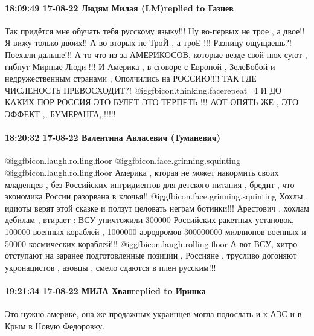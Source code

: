  
 
 
 
 

\paragraph{18:09:49 17-08-22 Людям Милая (LM)replied to Газиев}

\obeycr
Так придётся мне обучать тебя русскому языку!!!
Ну во-первых не трое , а двое!! Я вижу только двоих!!
А во-вторых не
ТроЙ , а троЕ !!! Разницу ощущаешь?!
Поехали дальше!!!
А то что из-за АМЕРИКОСОВ, которые везде свой нюх суют , гибнут Мирные Люди !!!
И Америка , в сговоре с Европой , ЗелеБобой и недружественным странами , Ополчились на РОССИЮ!!!! ТАК ГДЕ ЧИСЛЕНОСТЬ ПРЕВОСХОДИТ?! @igg{fbicon.thinking.face}{repeat=4}  И ДО КАКИХ ПОР РОССИЯ ЭТО БУЛЕТ ЭТО ТЕРПЕТЬ !!!
АОТ ОПЯТЬ ЖЕ , ЭТО ЭФФЕКТ ,, БУМЕРАНГА,,!!!!!
\restorecr


\paragraph{18:20:32 17-08-22 Валентина Авласевич (Туманевич)}

\obeycr
 @igg{fbicon.laugh.rolling.floor}  @igg{fbicon.face.grinning.squinting}  @igg{fbicon.laugh.rolling.floor}  Америка , кторая не может накормить своих младенцев , без Российских ингридиентов для детского питания , бредит , что экономика России разорвана в клочья!! @igg{fbicon.face.grinning.squinting}  Хохлы , идиоты верят этой сказке и ползут целовать неграм ботинки!!!
Арестович , хохлам дебилам , втирает : ВСУ уничтожили 300000 Российских ракетных установок, 100000 военных кораблей , 1000000 аэродромов 300000000 миллионов военных и 50000 космических кораблей!!! @igg{fbicon.laugh.rolling.floor}  А вот ВСУ, хитро отступают на заранее подготовленные позиции , Россияне , трусливо догоняют укронацистов , азовцы , смело сдаются в плен русским!!!
\restorecr

\paragraph{19:21:34 17-08-22 МИЛА Хванreplied to Иринка}

Это нужно америке, она же продажных украинцев могла подослать и к АЭС и в Крым
в Новую Федоровку.
